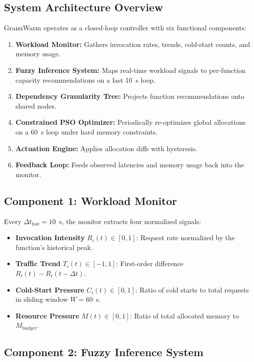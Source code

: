\documentclass[final,5p,times,twocolumn]{elsarticle}
\begin{document}
\subsection{System Architecture Overview}

GranuWarm operates as a closed-loop controller with six functional components:
\begin{enumerate}
    \item \textbf{Workload Monitor:} Gathers invocation rates, trends, cold-start counts, and memory usage.
    \item \textbf{Fuzzy Inference System:} Maps real-time workload signals to per-function capacity recommendations on a fast 10~s loop.
    \item \textbf{Dependency Granularity Tree:} Projects function recommendations onto shared nodes.
    \item \textbf{Constrained PSO Optimizer:} Periodically re-optimizes global allocations on a 60~s loop under hard memory constraints.
    \item \textbf{Actuation Engine:} Applies allocation diffs with hysteresis.
    \item \textbf{Feedback Loop:} Feeds observed latencies and memory usage back into the monitor.
\end{enumerate}

\subsection{Component 1: Workload Monitor}

Every $\Delta t_{\text{fast}} = 10$~s, the monitor extracts four normalized signals:
\begin{itemize}[leftmargin=*]
    \item \textbf{Invocation Intensity} $R_i(t) \in [0, 1]$: Request rate normalized by the function's historical peak.
    \item \textbf{Traffic Trend} $T_i(t) \in [-1, 1]$: First-order difference $R_i(t) - R_i(t - \Delta t)$.
    \item \textbf{Cold-Start Pressure} $C_i(t) \in [0, 1]$: Ratio of cold starts to total requests in sliding window $W = 60$~s.
    \item \textbf{Resource Pressure} $M(t) \in [0, 1]$: Ratio of total allocated memory to $M_{\text{budget}}$.
\end{itemize}

\subsection{Component 2: Fuzzy Inference System}
\end{document}
